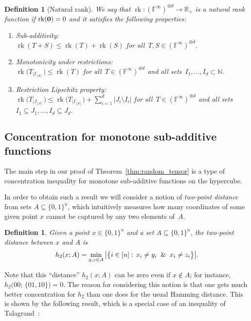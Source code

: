 \documentclass[10pt]{article}
\newtheorem{definition}[theorem]{Definition}
\newcommand{\R}{\mathbb{R}}
\newcommand{\N}{\mathbb{N}}
\newcommand{\F}{\mathbb{F}}
\newcommand{\bset}[1]{\{0,1\}^{#1}}
\newcommand{\1}{\mathbf{1}}
\newcommand{\st}{:\,}
\DeclareMathOperator{\rank}{rk}
\newcommand{\beqn}{\begin{equation*}}
\newcommand{\eeqn}{\end{equation*}}
\begin{document}
\begin{definition}[Natural rank]\label{def:nat_rank}
We say that $\rank: (\F^{\infty})^{\otimes d} \to \R_+$ is a natural rank function if $\rank({\bf 0}) = 0$ and it satisfies the following properties:
\begin{enumerate}
    \item Sub-additivity: \\
    $\rank(T+S) \leq \rank(T) + \rank(S)$ for all~$T, S\in (\F^{\infty})^{\otimes d}$.
    \item Monotonicity under restrictions: \\
    $\rank\big(T_{|I_{[d]}}\big) \leq \rank(T)$ for all~$T\in (\F^{\infty})^{\otimes d}$ and all sets~$I_1, \dots, I_d \subset \N$.
    \item Restriction Lipschitz property: \\
    $\rank\big(T_{|J_{[d]}}\big) \leq \rank\big(T_{|I_{[d]}}\big) + \sum_{i=1}^d |J_i \setminus I_i|$
    for all~$T\in (\F^{\infty})^{\otimes d}$ and all sets~$I_1\subseteq J_1, \dots, I_d\subseteq J_d$.
    \end{enumerate}
\end{definition}
\setcounter{theorem}{2}
\subsection{Concentration for monotone sub-additive functions}

The main step in our proof of Theorem~\ref{thm:random_tensor} is a type of concentration inequality for monotone sub-additive functions on the hypercube.

In order to obtain such a result we will consider a notion of \emph{two-point distance} from sets $A\subseteq \bset{n}$, which intuitively measures how many coordinates of some given point $x$ cannot be captured by any two elements of~$A$.

\begin{definition}
Given a point $x\in \bset{n}$ and a set $A \subseteq \bset{n}$, the two-point distance between $x$ and $A$ is
\beqn
h_2(x; A) = \min_{y, z \in A} \big|\big\{i \in [n] \st x_i \neq y_i \And x_i \neq z_i\big\}\big|.
\eeqn
\end{definition}

Note that this ``distance'' $h_2(x; A)$ can be zero even if $x \notin A$;
for instance, $h_2\big(00;\, \{01, 10\}\big) = 0$.
The reason for considering this notion is that one gets much better concentration for $h_2$ than one does for the usual Hamming distance.
This is shown by the following result, which is a special case of an inequality of Talagrand~\cite[Theorem 3.1.1]{Talagrand:1995}:
\end{document}
